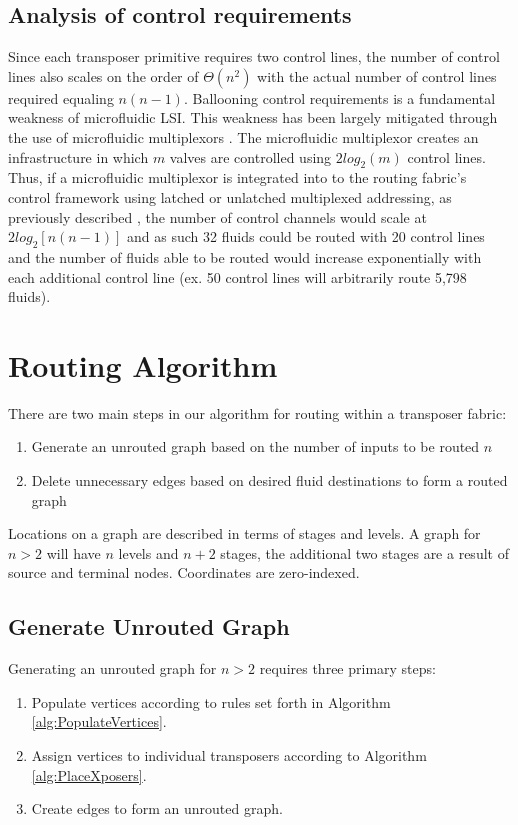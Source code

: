 \subsection{Analysis of control requirements}
Since each transposer primitive requires two control lines, the number of control lines also scales on the order of $\Theta(n^2)$ with the actual number of control lines required equaling $n(n-1)$. Ballooning control requirements is a fundamental weakness of microfluidic LSI. This weakness has been largely mitigated through the use of microfluidic multiplexors \cite{thorsen2002}. The microfluidic multiplexor creates an infrastructure in which $m$ valves are controlled using $2 log_2(m)$ control lines. Thus, if a microfluidic multiplexor is integrated into to the routing fabric's control framework using latched or unlatched multiplexed addressing, as previously described \cite{melin2007}, the number of control channels would scale at $2log_2[n(n-1)]$ and as such 32 fluids could be routed with 20 control lines and the number of fluids able to be routed would increase exponentially with each additional control line (ex. 50 control lines will arbitrarily route 5,798 fluids). 
\section{Routing Algorithm}
\label{ssec:alg}
There are two main steps in our algorithm for routing within a transposer fabric:
\begin{enumerate}
	\item Generate an unrouted graph based on the number of inputs to be routed $n$
	\item Delete unnecessary edges based on desired fluid destinations to form a routed graph 
\end{enumerate}
Locations on a graph are described in terms of stages and levels. A graph for $n>2$ will have $n$ levels and $n+2$ stages, the additional two stages are a result of source and terminal nodes. Coordinates are zero-indexed. 
    \subsection{Generate Unrouted Graph}
    \label{sec:unrouted}
    Generating an unrouted graph for $n>2$ requires three primary steps:
	\begin{enumerate}
			\item Populate vertices according to rules set forth in Algorithm \ref{alg:PopulateVertices}.
			\item Assign vertices to individual transposers according to Algorithm \ref{alg:PlaceXposers}.
			\item Create edges to form an unrouted graph.
		\end{enumerate}

